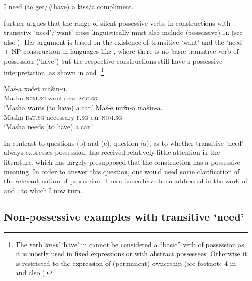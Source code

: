 \documentclass[output=paper]{langscibook}
\begin{document}
\ea\label{get} I need (to get/\#have) a kiss/a compliment.\hfill \citep[215]{Harves2008}\label{need-get}
\z

\noindent \citet{Harves2008} further argues that the range of silent possessive verbs in constructions with transitive `need'/`want' cross-linguistically must also include (possessive) \textsc{be} (see also \citealt{Harves.Kayne2012}). Her argument is based on the existence of transitive `want' and the `need' + NP construction in languages like , where there is no basic transitive verb of possession (`have') but the respective constructions still have a possessive interpretation, as shown in  and .\footnote{\label{footnote-imet}The verb \textit{imet'} `have' in  cannot be considered a ``basic'' verb of possession as it is mostly used in fixed expressions or with abstract possessees. Otherwise it is restricted to the expression of (permanent) ownership (see footnote 4 in \citealt{Harves.Kayne2012} and also \citealt[440ff.]{Stolz.Kettler.Stroh.Urdze2008}).}

\ea
\ea \gll Maš-a xočet mašin-u.\label{xotet}\\
Masha-\textsc{nom.sg} wants car-\textsc{acc.sg}\\
\glt `Masha wants (to have) a car.'
\ex \gll Maš-e nužn-a mašin-a.\label{nuzhen}\\
Masha-\textsc{dat.sg} necessary-\textsc{f.sg} car-\textsc{nom.sg}\\
\glt `Masha needs (to have) a car.'
\z\z

\noindent In contrast to questions (b) and (c), question (a), as to whether transitive `need' always expresses possession, has received relatively little attention in the literature, which has largely presupposed that the construction has a possessive meaning. In order to answer this question, one would need some clarification of the relevant notion of possession. These issues have been addressed in the work of \citet{Schwarz2006} and \citet{Zaroukian.Beller2013}, to which I now turn.

\subsection{Non-possessive examples with transitive `need'}\label{section-problematic}
\end{document}
